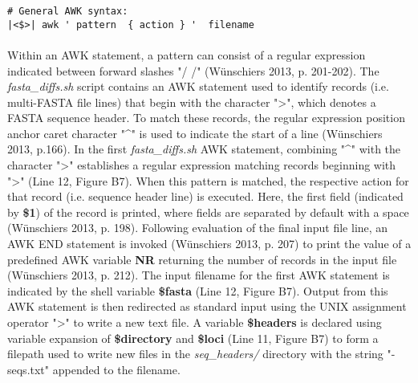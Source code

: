 \vspace*{36pt}

\begin{lstlisting}[caption={An example AWK statement.}]
# General AWK syntax:
|<$>| awk ' pattern  { action } '  filename
\end{lstlisting}

\vspace*{36pt}

\paragraph{} Within an AWK statement, a pattern can consist of a regular expression indicated between forward slashes "/ /" (Wünschiers 2013, p. 201-202).  The \textit{fasta\_diffs.sh} script contains an AWK statement used to identify records (i.e. multi-FASTA file lines) that begin with the character ">", which denotes a FASTA sequence header.  To match these records, the regular expression position anchor caret character "\string^" is used to indicate the start of a line (Wünschiers 2013, p.166).  In the first \textit{fasta\_diffs.sh} AWK statement, combining "\string^" with the character ">"  establishes a regular expression matching records beginning with ">" (Line 12, Figure B7).  When this pattern is matched, the respective action for that record (i.e. sequence header line) is executed.  Here, the first field (indicated by \textbf{\$1}) of the record is printed, where fields are separated by default with a space (Wünschiers 2013, p. 198).  Following evaluation of the final input file line, an AWK END statement is invoked (Wünschiers 2013, p. 207) to print the value of a predefined AWK variable \textbf{NR} returning the number of records in the input file (Wünschiers 2013, p. 212).  The input filename for the first AWK statement is indicated by the shell variable \textbf{\$fasta} (Line 12, Figure B7).  Output from this AWK statement is then redirected as standard input using the UNIX assignment operator ">" to write a new text file.  A variable \textbf{\$headers} is declared using variable expansion of \textbf{\$directory} and \textbf{\$loci} (Line 11, Figure B7) to form a filepath used to write new files in the \textit{seq\_headers/} directory with the string "-seqs.txt" appended to the filename.

